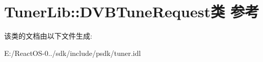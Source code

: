 \hypertarget{class_tuner_lib_1_1_d_v_b_tune_request}{}\section{Tuner\+Lib\+:\+:D\+V\+B\+Tune\+Request类 参考}
\label{class_tuner_lib_1_1_d_v_b_tune_request}


该类的文档由以下文件生成\+:\begin{DoxyCompactItemize}
\item 
E\+:/\+React\+O\+S-\/0../sdk/include/psdk/tuner.\+idl\end{DoxyCompactItemize}
